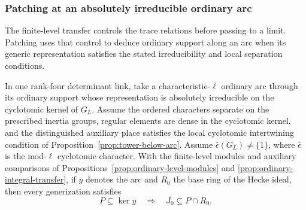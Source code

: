 \subsubsection{Patching at an absolutely irreducible ordinary arc}
\label{par:ordinary-patching}

The finite-level transfer controls the trace relations before passing to a limit. Patching uses that control to deduce ordinary support along an arc when its generic representation satisfies the stated irreducibility and local separation conditions.

\begin{proposition}\label{prop:ordinary-one-point-patching}
In one rank-four determinant link, take a characteristic-\(\ell\)
ordinary arc through its ordinary support whose representation is
absolutely irreducible on the cyclotomic kernel of \(G_L\).
Assume the ordered characters separate on the prescribed inertia
groups, regular elements are dense in the cyclotomic kernel, and
the distinguished auxiliary place satisfies the local cyclotomic
intertwining condition of Proposition~\ref{prop:tower-below-arc}.
Assume \(\bar\epsilon(G_L)\ne\{1\}\), where \(\bar\epsilon\)
is the mod-\(\ell\) cyclotomic character.
With the finite-level modules and auxiliary comparisons of
Propositions~\ref{prop:ordinary-level-modules}
and \ref{prop:ordinary-integral-transfer}, if \(y\) denotes the arc and \(R_0\) the base ring of the Hecke ideal, then every generization satisfies 
\[
 P\subseteq\ker y\quad\Longrightarrow\quad J_0\subseteq P\cap R_0.
\]

\end{proposition}

